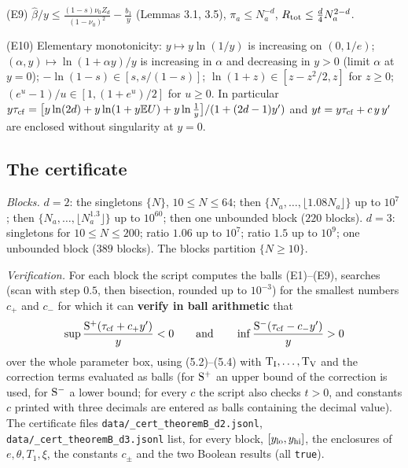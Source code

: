 \documentclass[11pt,a4paper]{article}
\theoremstyle{definition}
\theoremstyle{remark}
\begin{document}
(E9) $\hat\beta/y\le\frac{(1-s)\nu_0Z_d}{(1-\nu_0)^2}-\frac{b_1}{y}$ (Lemmas 3.1, 3.5), $\pi_a\le N_a^{-d}$, $R_{\rm tot}\le\frac d4N_a^{2-d}$.

(E10) Elementary monotonicity: $y\mapsto y\ln(1/y)$ is increasing on $(0,1/e)$; $(\alpha,y)\mapsto\ln(1+\alpha y)/y$ is increasing in $\alpha$ and decreasing in $y>0$ (limit $\alpha$ at $y=0$); $-\ln(1-s)\in[s,s/(1-s)]$; $\ln(1+z)\in[z-z^2/2,z]$ for $z\ge0$; $(e^{u}-1)/u\in[1,(1+e^{u})/2]$ for $u\ge0$. In particular $y\tau_{\rm cf}=\bigl[y\ln(2d)+y\ln(1+y\mathbb EU)+y\ln\frac1y\bigr]/(1+(2d-1)y')$ and $yt=y\tau_{\rm cf}+c\,y\,y'$ are enclosed without singularity at $y=0$.

\subsection{The certificate}

\emph{Blocks.} $d=2$: the singletons $\{N\}$, $10\le N\le64$; then $\{N_a,\dots,\lfloor1.08N_a\rfloor\}$ up to $10^7$; then $\{N_a,\dots,\lfloor N_a^{1.3}\rfloor\}$ up to $10^{60}$; then one unbounded block ($220$ blocks). $d=3$: singletons for $10\le N\le200$; ratio $1.06$ up to $10^7$; ratio $1.5$ up to $10^9$; one unbounded block ($389$ blocks). The blocks partition $\{N\ge10\}$.

\emph{Verification.} For each block the script computes the balls (E1)–(E9), searches (scan with step $0.5$, then bisection, rounded up to $10^{-3}$) for the smallest numbers $c_+$ and $c_-$ for which it can \textbf{verify in ball arithmetic} that
\begin{gather*}
\sup\frac{{\rm S}^+(\tau_{\rm cf}+c_+y')}{y}<0 \qquad \text{and} \qquad \inf\frac{{\rm S}^-(\tau_{\rm cf}-c_-y')}{y}>0
\end{gather*}
over the whole parameter box, using (5.2)–(5.4) with ${\rm T_I},\dots,{\rm T_V}$ and the correction terms evaluated as balls (for ${\rm S}^+$ an upper bound of the correction is used, for ${\rm S}^-$ a lower bound; for every $c$ the script also checks $t>0$, and constants $c$ printed with three decimals are entered as balls containing the decimal value). The certificate files \texttt{data/\_\allowbreak cert\_\allowbreak theoremB\_\allowbreak d2.jsonl}, \texttt{data/\_\allowbreak cert\_\allowbreak theoremB\_\allowbreak d3.jsonl} list, for every block, $[y_{\rm lo},y_{\rm hi}]$, the enclosures of $e,\theta,T_1,\xi$, the constants $c_\pm$ and the two Boolean results (all \texttt{true}).
\end{document}
